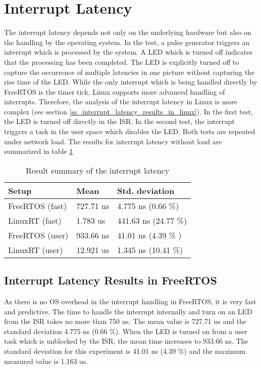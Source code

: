 \section{Interrupt Latency}\label{s_interrupt_latency} 
The interrupt latency depends not only on the underlying hardware but also on the handling by the operating system.
In the test, a pulse generator triggers an interrupt which is processed by the system.
A \ac{LED} which is turned off indicates that the processing has been completed. 
The \ac{LED} is explicitly turned off to capture the occurrence of multiple latencies in one picture without capturing the rise time of the \ac{LED}.
While the only interrupt which is being handled directly by FreeRTOS is the timer tick, Linux supports more advanced handling of interrupts.
Therefore, the analysis of the interrupt latency in Linux is more complex (see section \ref{ss_interrupt_latency_results_in_linux}). 
In the first test, the \ac{LED} is turned off directly in the \ac{ISR}.
In the second test, the interrupt triggers a task in the user space which disables the \ac{LED}. 
Both tests are repeated under network load.
The results for interrupt latency without load are summarized in table \ref{tab_summary_interrupts}

\begin{table}[htb]
	\centering
		\begin{tabular}{|l||l|l|}
			\hline
			Setup & Mean  & Std. deviation \\
			\hline
			  FreeRTOS (fast)	&  727.71 ns	& 4.775 ns (0.66 \%) \\
			  \hline
			  LinuxRT (fast) 	&  1.783 us & 441.63 ns (24.77 \%) \\
			  \hline
			  FreeRTOS (user)	& 933.66 ns & 41.01 ns (4.39 \% ) \\
			  \hline
			  LinuxRT (user)	& 12.921 us	& 1.345 ns (10.41 \%)\\
			  \hline
		\end{tabular}
	\caption{Result summary of the interrupt latency}
	\label{tab_summary_interrupts}
\end{table}

\subsection{Interrupt Latency Results in FreeRTOS}
As there is no \ac{OS} overhead in the interrupt handling in FreeRTOS, it is very fast and predictive.
The time to handle the interrupt internally and turn on an \ac{LED} from the \ac{ISR} takes no more than 750 ns. 
The mean value is 727.71 ns and the standard deviation 4.775 ns (0.66 \%). 
When the \ac{LED} is turned on from a user task which is unblocked by the \ac{ISR}, the mean time increases to 933.66 ns.
The standard deviation for this experiment is 41.01 ns (4.39 \%) and the maximum measured value is 1.163 us.
  
